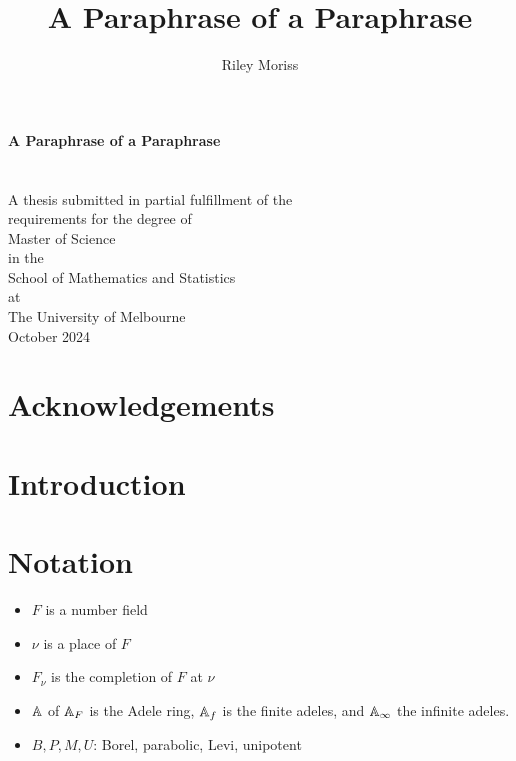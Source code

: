 \documentclass[12pt, openany]{book}
\title{A Paraphrase of a Paraphrase}
\author{Riley Moriss}
\numberwithin{equation}{section}
\theoremstyle{definition}
\theoremstyle{remark}
\numberwithin{equation}{section}
\begin{document}
    \begin{titlepage}
    \begin{center}
    \vspace*{1cm}
    \huge
    \textbf{A Paraphrase of a Paraphrase}\\
    \vspace{2cm}
    \Large
    \\
    \vspace{0.5cm}
    \\    
 
    A thesis submitted in partial fulfillment of the\\
    requirements for the degree of\\
    Master of Science\\
    in the\\
    School of Mathematics and Statistics\\
    at\\
    The University of Melbourne\\
    \vspace{1,5cm}
    October 2024
\end{center}
\end{titlepage}

\pagebreak


\chapter*{Acknowledgements}

\chapter*{Introduction}


\tableofcontents
{}

\chapter*{Notation}

\begin{itemize}
    \item \(F\) is a number field
    \item \(\nu\) is a place of \(F\)
    \item \(F_\nu\) is the completion of \(F\) at \(\nu\)
    \item \(\A\) of \(\A_F\) is the Adele ring, \(\A_f\) is the finite adeles, and \(\A_\infty\) the infinite adeles.
    \item \(B, P, M, U\): Borel, parabolic, Levi, unipotent
\end{itemize}
\end{document}

